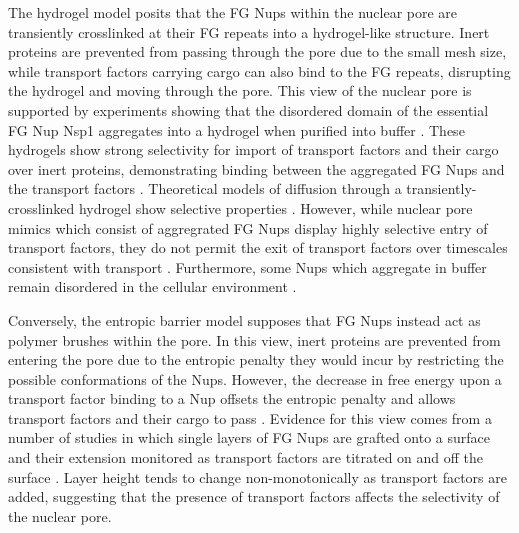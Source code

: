 The hydrogel model posits that the FG Nups within the nuclear pore are transiently crosslinked at their FG repeats into a hydrogel-like structure.  Inert proteins are prevented from passing through the pore due to the small mesh size, while transport factors carrying cargo can also bind to the FG repeats, disrupting the hydrogel and moving through the pore.  This view of the nuclear pore is supported by experiments showing that the disordered domain of the essential FG Nup Nsp1 aggregates into a hydrogel when purified into buffer \cite{frey06}.  These hydrogels show strong selectivity for import of transport factors and their cargo over inert proteins, demonstrating binding between the aggregated FG Nups and the transport factors \cite{frey07,ader10,kim15}.  Theoretical models of diffusion through a transiently-crosslinked hydrogel show selective properties \cite{ribbeck01, bickel02,gu19}.   However, while nuclear pore mimics which consist of aggregrated FG Nups display highly selective entry of transport factors, they do not permit the exit of transport factors over timescales consistent with transport \cite{frey07,ader10}.  Furthermore, some Nups which aggregate in buffer remain disordered in the cellular environment \cite{hough15}.

Conversely, the entropic barrier model supposes that FG Nups instead act as polymer brushes within the pore.  In this view, inert proteins are prevented from entering the pore due to the entropic penalty they would incur by restricting the possible conformations of the Nups.  However, the decrease in free energy upon a transport factor binding to a Nup offsets the entropic penalty and allows transport factors and their cargo to pass \cite{rout00, lim08}.  Evidence for this view comes from a number of studies in which single layers of FG Nups are grafted onto a surface and their extension monitored as transport factors are titrated on and off the surface \cite{wagner15,zahn16,vovk16}.  Layer height tends to change non-monotonically as transport factors are added, suggesting that the presence of transport factors affects the selectivity of the nuclear pore.


